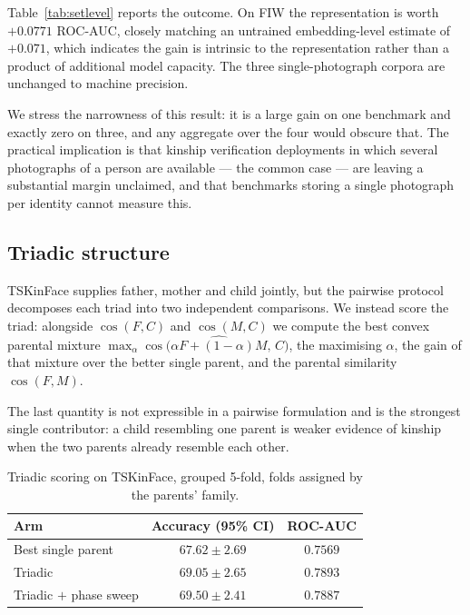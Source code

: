 \documentclass[journal,12pt]{IEEEtran}
\begin{document}
Table~\ref{tab:setlevel} reports the outcome. On FIW the representation is worth
$+0.0771$ ROC-AUC, closely matching an untrained embedding-level estimate of
$+0.071$, which indicates the gain is intrinsic to the representation rather
than a product of additional model capacity. The three single-photograph corpora
are unchanged to machine precision.

We stress the narrowness of this result: it is a large gain on one benchmark and
exactly zero on three, and any aggregate over the four would obscure that. The
practical implication is that kinship verification deployments in which several
photographs of a person are available --- the common case --- are leaving a
substantial margin unclaimed, and that benchmarks storing a single photograph
per identity cannot measure this.

\subsection{Triadic structure}

TSKinFace supplies father, mother and child jointly, but the pairwise protocol
decomposes each triad into two independent comparisons. We instead score the
triad: alongside $\cos(F,C)$ and $\cos(M,C)$ we compute the best convex
parental mixture $\max_\alpha \cos\big(\widehat{\alpha F + (1-\alpha)M},\,
C\big)$, the maximising $\alpha$, the gain of that mixture over the better
single parent, and the parental similarity $\cos(F,M)$.

The last quantity is not expressible in a pairwise formulation and is the
strongest single contributor: a child resembling one parent is weaker evidence
of kinship when the two parents already resemble each other.

\begin{table}[t]
\caption{Triadic scoring on TSKinFace, grouped 5-fold, folds assigned by the
parents' family.}
\label{tab:triadic}
\centering
\begin{tabular}{lcc}
\toprule
Arm & Accuracy (95\% CI) & ROC-AUC \\
\midrule
Best single parent & $67.62 \pm 2.69$ & $0.7569$ \\
Triadic & $\mathbf{69.05 \pm 2.65}$ & $\mathbf{0.7893}$ \\
Triadic $+$ phase sweep & $69.50 \pm 2.41$ & $0.7887$ \\
\bottomrule
\end{tabular}
\end{table}
\end{document}
